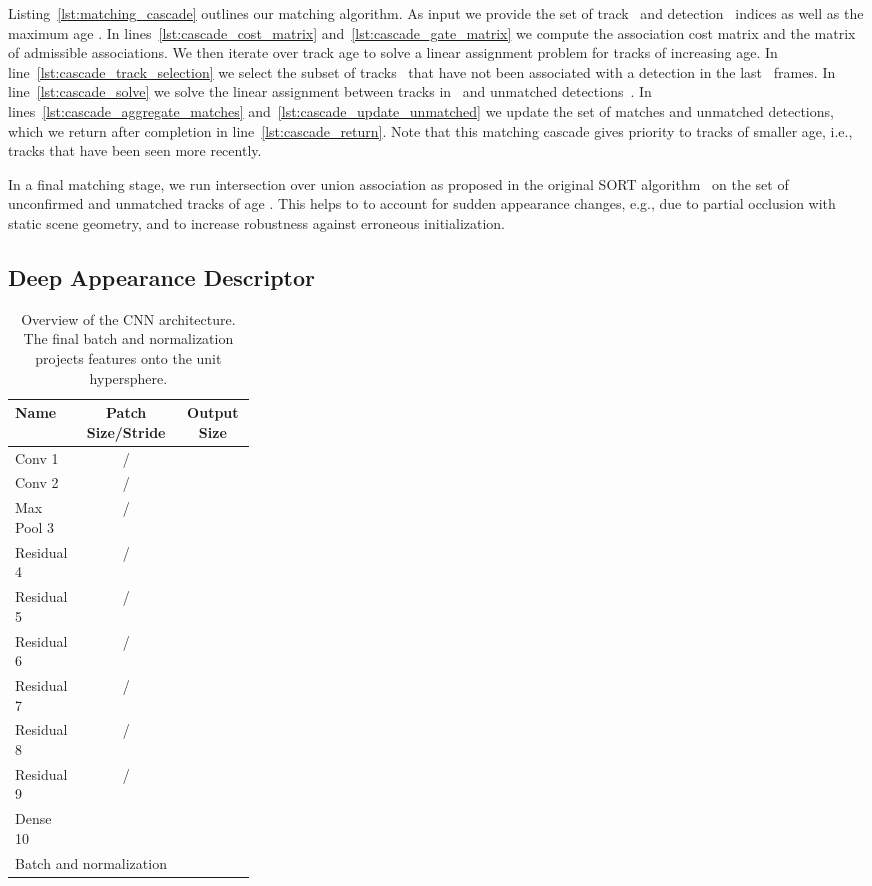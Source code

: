 \documentclass{article}
\begin{document}
Listing~\ref{lst:matching_cascade} outlines our matching algorithm.
As input we provide the set of track~ and detection~
indices as well as the maximum age .
In lines~\ref{lst:cascade_cost_matrix} and~\ref{lst:cascade_gate_matrix} we
compute the association cost matrix and the matrix of admissible associations.
We then iterate over track age  to solve a linear assignment problem
for tracks of increasing age.
In line~\ref{lst:cascade_track_selection} we select the subset of
tracks~ that have not been associated with a detection in the
last~ frames.
In line~\ref{lst:cascade_solve} we solve the linear assignment between tracks
in~ and unmatched detections~.
In lines~\ref{lst:cascade_aggregate_matches}
and~\ref{lst:cascade_update_unmatched} we update the set of matches and
unmatched detections,
which we return after completion in line~\ref{lst:cascade_return}.
Note that this matching cascade gives priority to tracks of smaller age, i.e.,
tracks that have been seen more recently.

In a final matching stage, we run intersection over union association
as proposed in the original SORT algorithm~\cite{Bewley2016_sort}
on the set of unconfirmed and unmatched tracks of age . This helps to
to account for sudden appearance changes, e.g., due to partial occlusion with
static scene geometry, and to increase robustness against erroneous
initialization.

\subsection{Deep Appearance Descriptor}
\label{subsec:metric-learning}

\begin{table}[t!]
    \begin{tabular}{p{0.28\linewidth}cc}
        \toprule
        \textbf{Name} & \textbf{Patch Size/Stride} & \textbf{Output Size} \\
        \midrule
        Conv 1 & / &  \\
        Conv 2 & / &  \\
        Max Pool 3 & / &  \\
        Residual 4 & / &  \\
        Residual 5 & / &  \\
        Residual 6 & / &  \\
        Residual 7 & / &  \\
        Residual 8 & / &  \\
        Residual 9 & / &  \\
        Dense 10 & &  \\
        \multicolumn{2}{l}{Batch and  normalization} &  \\
        \bottomrule
    \end{tabular}
    \caption{Overview of the CNN architecture. The final batch and 
    normalization projects features onto the unit hypersphere.}
\label{tab:network-architecture}
\end{table}
\end{document}
